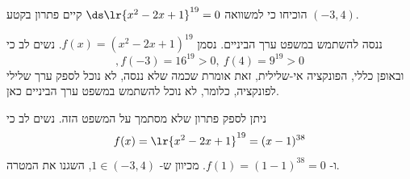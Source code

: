 הוכיחו כי למשוואה
$\ds \lr{x^2-2x+1}^{19}=0$ קיים פתרון בקטע
$(-3,4)$.
\begin{solbox}
ננסה להשתמש במשפט ערך הביניים. נסמן
$f(x)=(x^2-2x+1)^{19}$.
נשים לב כי
$$,f(-3)=16^{19}>0,\ f(4)=9^{19}>0$$
ובאופן כללי, הפונקציה אי-שלילית, זאת אומרת שכמה שלא ננסה, לא נוכל לספק ערך שלילי לפונקציה, כלומר, לא נוכל להשתמש במשפט ערך הביניים כאן.

ניתן לספק פתרון שלא מסתמך על המשפט הזה.
נשים לב כי
$$f(x)=\lr{x^2-2x+1}^{19}=(x-1)^{38}$$
ו-
$f(1)=(1-1)^{38}=0$.
מכיוון ש-
$1\in(-3,4)$,
השגנו את המטרה.
\end{solbox}
